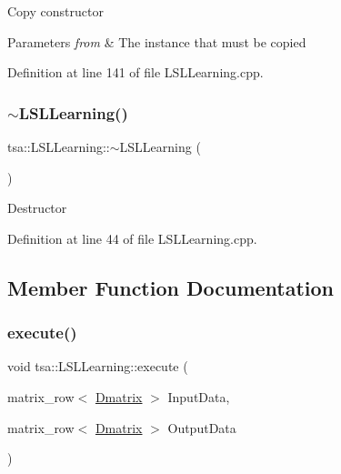 Copy constructor


\begin{DoxyParams}{Parameters}
{\em from} & The instance that must be copied \\
\hline
\end{DoxyParams}


Definition at line 141 of file L\+S\+L\+Learning.\+cpp.

\mbox{\label{classtsa_1_1_l_s_l_learning_aab97f819bb4e1537621d9e84ee0bf140}} 
\subsubsection{\texorpdfstring{$\sim$\+L\+S\+L\+Learning()}{~LSLLearning()}}
{\footnotesize\ttfamily tsa\+::\+L\+S\+L\+Learning\+::$\sim$\+L\+S\+L\+Learning (\begin{DoxyParamCaption}{ }\end{DoxyParamCaption})}

Destructor 

Definition at line 44 of file L\+S\+L\+Learning.\+cpp.



\subsection{Member Function Documentation}
\mbox{\label{classtsa_1_1_l_s_l_learning_a9ec866ab1a8d8173e77519ce9f9855d5}} 
\subsubsection{\texorpdfstring{execute()}{execute()}}
{\footnotesize\ttfamily void tsa\+::\+L\+S\+L\+Learning\+::execute (\begin{DoxyParamCaption}\item[{matrix\+\_\+row$<$ \hyperlink{namespacetsa_ad260cd21c1891c4ed391fe788569aba4}{Dmatrix} $>$}]{Input\+Data,  }\item[{matrix\+\_\+row$<$ \hyperlink{namespacetsa_ad260cd21c1891c4ed391fe788569aba4}{Dmatrix} $>$}]{Output\+Data }\end{DoxyParamCaption})}


